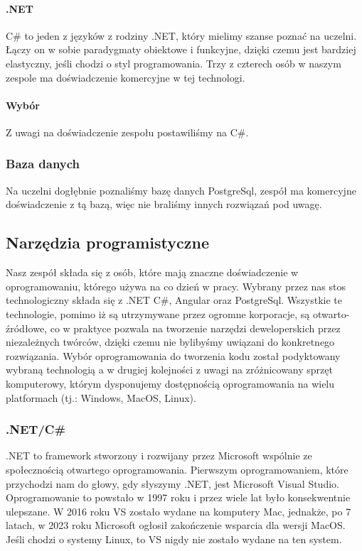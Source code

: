 \paragraph{.NET}
C\# to jeden z języków z rodziny .NET, który mielimy szanse poznać na uczelni.
Łączy on w sobie paradygmaty obiektowe i funkcyjne, dzięki czemu jest bardziej elastyczny, jeśli chodzi o styl programowania.
Trzy z czterech osób w naszym zespole ma doświadczenie komercyjne w tej technologi.

\paragraph{Wybór}
Z uwagi na doświadczenie zespołu postawiliśmy na C\#.

\subsubsection{Baza danych}
Na uczelni dogłębnie poznaliśmy bazę danych PostgreSql, zespół ma komercyjne doświadczenie z tą bazą, więc nie braliśmy innych rozwiązań pod uwagę.

\subsection{Narzędzia programistyczne}
\label{subsec:narzedzia-programistyczne}
Nasz zespół składa się z osób, które mają znaczne doświadczenie w oprogramowaniu, którego używa na co dzień w pracy.
Wybrany przez nas stos technologiczny składa się z .NET C\#, Angular oraz PostgreSql.
Wszystkie te technologie, pomimo iż są utrzymywane przez ogromne korporacje, są otwarto-źródłowe, co w praktyce pozwala na tworzenie narzędzi deweloperskich przez niezależnych twórców, dzięki czemu nie bylibyśmy uwiązani do konkretnego rozwiązania.
Wybór oprogramowania do tworzenia kodu został podyktowany wybraną technologią a w drugiej kolejności z uwagi na zróżnicowany sprzęt komputerowy, którym dysponujemy  dostępnością oprogramowania na wielu platformach (tj.: Windows, MacOS, Linux).

\subsubsection{.NET/C\#}
.NET to framework stworzony i rozwijany przez Microsoft wspólnie ze społecznością otwartego oprogramowania.
Pierwszym oprogramowaniem, które przychodzi nam do głowy, gdy słyszymy .NET, jest Microsoft Visual Studio.
Oprogramowanie to powstało w 1997 roku i przez wiele lat było konsekwentnie ulepszane.
W 2016 roku VS zostało wydane na komputery Mac, jednakże, po 7 latach, w 2023 roku Microsoft ogłosił zakończenie wsparcia dla wersji MacOS.
Jeśli chodzi o systemy Linux, to VS nigdy nie zostało wydane na ten system.


